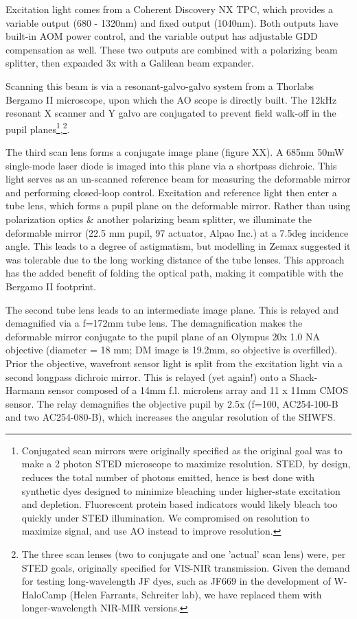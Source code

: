 \documentclass[a4paper,12pt]{article}
\begin{document}
Excitation light comes from a Coherent Discovery NX TPC, which provides a variable output (680 - 1320nm) and fixed output (1040nm).  Both outputs have built-in AOM power control, and the variable output has adjustable GDD compensation as well.  These two outputs are combined with a polarizing beam splitter, then expanded 3x with a Galilean beam expander.  

Scanning this beam is via a resonant-galvo-galvo system from a Thorlabs Bergamo II microscope, upon which the AO scope is directly built.  The 12kHz resonant X scanner and Y galvo are conjugated to prevent field walk-off in the pupil planes\footnote{Conjugated scan mirrors were originally specified as the original goal was to make a 2 photon STED microscope to maximize resolution.  STED, by design, reduces the total number of photons emitted, hence is best done with synthetic dyes designed to minimize bleaching under higher-state excitation and depletion.  Fluorescent protein based indicators would likely bleach too quickly under STED illumination.  We compromised on resolution to maximize signal, and use AO instead to improve resolution. },\footnote{The three scan lenses (two to conjugate and one 'actual' scan lens) were, per STED goals, originally specified for VIS-NIR transmission.  Given the demand for testing long-wavelength JF dyes, such as JF669 in the development of W-HaloCamp (Helen Farrants, Schreiter lab), we have replaced them with longer-wavelength NIR-MIR versions.}.  

The third scan lens forms a conjugate image plane (figure XX).  A 685nm 50mW single-mode laser diode is imaged into this plane via a shortpass dichroic.  This light serves as an un-scanned reference beam for measuring the deformable mirror and performing closed-loop control.  Excitation and reference light then enter a tube lens, which forms a pupil plane on the deformable mirror.  Rather than using polarization optics \& another polarizing beam splitter, we illuminate the deformable mirror (22.5 mm pupil, 97 actuator, Alpao Inc.) at a 7.5deg incidence angle.  This leads to a degree of astigmatism, but modelling in Zemax suggested it was tolerable due to the long working distance of the tube lenses.  This approach has the added benefit of folding the optical path, making it compatible with the Bergamo II footprint.  

The second tube lens leads to an intermediate image plane.  This is relayed and demagnified via a f=172mm tube lens.  The demagnification makes the deformable mirror conjugate to the pupil plane of an Olympus 20x 1.0 NA objective (diameter = 18 mm; DM image is 19.2mm, so objective is overfilled).  Prior the objective, wavefront sensor light is split from the excitation light via a second longpass dichroic mirror.  This is relayed (yet again!) onto a Shack-Harmann sensor composed of a 14mm f.l. microlens array and 11 x 11mm CMOS sensor.  The relay demagnifies the objective pupil by 2.5x (f=100, AC254-100-B and two AC254-080-B), which increases the angular resolution of the SHWFS.  
\end{document}
